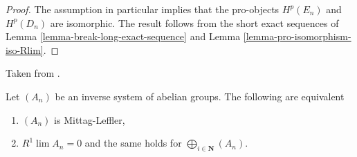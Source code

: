 \begin{proof}
The assumption in particular implies that the pro-objects
$H^p(E_n)$ and $H^p(D_n)$ are isomorphic. The result follows
from the short exact sequences of
Lemma \ref{lemma-break-long-exact-sequence}
and Lemma \ref{lemma-pro-isomorphism-iso-Rlim}.
\end{proof}

\begin{lemma}[Emmanouil]
\label{lemma-emmanouil}
\begin{reference}
Taken from \cite{Emmanouil}.
\end{reference}
Let $(A_n)$ be an inverse system of abelian groups.
The following are equivalent
\begin{enumerate}
\item $(A_n)$ is Mittag-Leffler,
\item $R^1\lim A_n = 0$ and
the same holds for $\bigoplus_{i \in \mathbf{N}} (A_n)$.
\end{enumerate}
\end{lemma}

